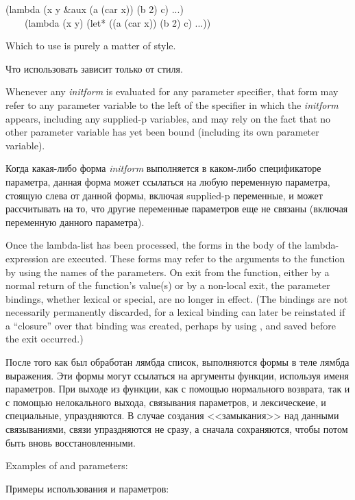 \begin{lisp}
(lambda (x y \&aux (a (car x)) (b 2) c) ...) \\
~~~\EQ\ (lambda (x y) (let* ((a (car x)) (b 2) c) ...))
\end{lisp}

Which to use is purely a matter of style.

Что использовать зависит только от стиля.

Whenever any \textit{initform} is evaluated for any parameter
specifier, that form may refer to any parameter variable to the left of
the specifier in which the \textit{initform} appears, including any supplied-p
variables, and may rely on the fact that no other parameter variable
has yet been bound (including its own parameter variable).

Когда какая-либо форма \textit{initform} выполняется в каком-либо спецификаторе
параметра, данная форма может ссылаться на любую переменную параметра, стоящую
слева от данной формы, включая supplied-p переменные, и может рассчитывать на
то, что другие переменные параметров еще не связаны (включая переменную данного
параметра).

Once the lambda-list has been processed, the forms in the body of the
lambda-expression are executed.  These forms may refer to the arguments
to the function by using the names of the parameters.  On exit from the
function, either by a normal return of the function's value(s) or by a
non-local exit, the parameter bindings, whether lexical or special, are
no longer in effect.  (The bindings are not necessarily permanently discarded,
for a lexical binding can later be reinstated if a
``closure'' over that binding was created,
perhaps by using , and saved before the exit occurred.)

После того как был обработан лямбда список, выполняются формы в теле лямбда
выражения. Эти формы могут ссылаться на аргументы функции, используя именя
параметров. При выходе из функции, как с помощью нормального возврата, так и с
помощью нелокального выхода, связывания параметров, и лексическеие, и
специальные, упраздняются. В случае создания <<замыкания>> над данными
связываниями, связи упраздняются не сразу, а сначала сохраняются, чтобы
потом быть вновь восстановленными.

\noindent
Examples of  and  parameters:

\noindent
Примеры использования  и  параметров:

